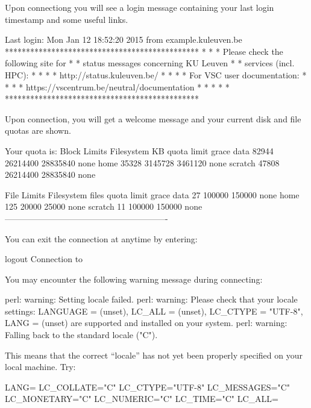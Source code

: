 \ifleuven
Upon connectiong you will see a login message containing your last login
timestamp and some useful links.
\begin{prompt}
Last login: Mon Jan 12 18:52:20 2015 from example.kuleuven.be
**********************************************
*                                            *
* Please check the following site for        *
* status messages concerning KU Leuven       *
* services (incl. HPC):                      *
*                                            *
*   http://status.kuleuven.be/               *
*                                            *
* For VSC user documentation:                *
*                                            *
* https://vscentrum.be/neutral/documentation *
*                                            *
*                                            *
**********************************************
\end{prompt}
\fi

\ifantwerpen
Upon connection, you will get a welcome message and your current disk and file
quotas are shown.

\begin{prompt}
Your quota is:
Block Limits
   Filesystem         KB      quota      limit    grace
   data            82944   26214400   28835840     none
   home            35328    3145728    3461120     none
   scratch         47808   26214400   28835840     none

File Limits
   Filesystem      files      quota      limit    grace
   data               27     100000     150000     none
   home              125      20000      25000     none
   scratch            11     100000     150000     none
----------------------------------------------------------
\end{prompt}
\fi

You can exit the connection at anytime by entering:

\begin{prompt}
logout
Connection to %
\end{prompt}

\begin{tip}

You may encounter the following warning message during connecting:
\begin{prompt}
perl: warning: Setting locale failed.
perl: warning: Please check that your locale settings:
LANGUAGE = (unset),
LC_ALL = (unset),
LC_CTYPE = "UTF-8",
LANG = (unset)
    are supported and installed on your system.
perl: warning: Falling back to the standard locale ("C").
\end{prompt}

This means that the correct ``locale'' has not yet been properly specified on
your local machine. Try:

\begin{prompt}
LANG=
LC_COLLATE="C"
LC_CTYPE="UTF-8"
LC_MESSAGES="C"
LC_MONETARY="C"
LC_NUMERIC="C"
LC_TIME="C"
LC_ALL=
\end{prompt}
\end{tip}

